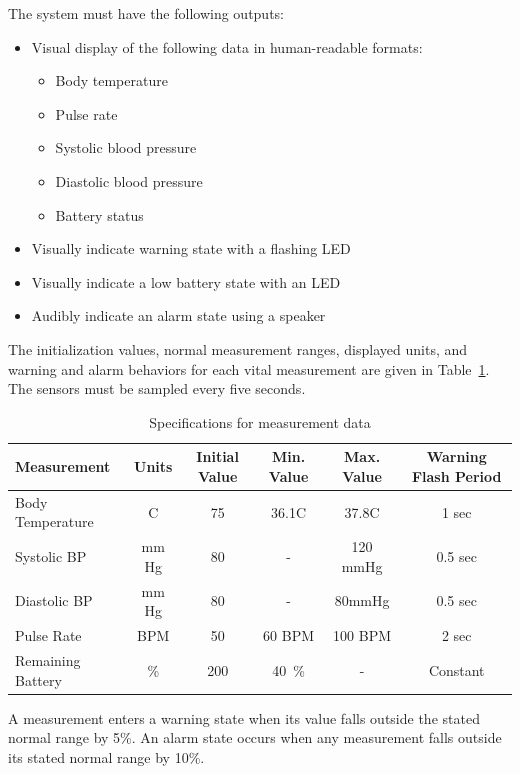 \documentclass[12pt]{article} %
\begin{document}
\begin{itemize}[$$]
 \item The system must have the following outputs:
    \begin{itemize}[$\bullet$]
      \item Visual display of the following data in human-readable formats:
	\begin{itemize}
	\item Body temperature
	\item Pulse rate
	\item Systolic blood pressure
	\item Diastolic blood pressure
	\item Battery status
	\end{itemize}
      \item Visually indicate warning state with a flashing LED
      \item Visually indicate a low battery state with an LED
      \item Audibly indicate an alarm state using a speaker
    \end{itemize}
\end{itemize}

The initialization values, normal measurement ranges, displayed units, and 
warning and alarm behaviors for each vital measurement are given in 
Table~\ref{tab:sensorDefs}. The sensors must be sampled every five seconds.

\begin{table}[h]
  \centering
  \begin{tabular}{|l|*{5}{c}|}
    \hline
    Measurement & Units & Initial Value & Min. Value & Max. Value & Warning Flash Period \\ \hline
    Body Temperature & C & 75 & 36.1C & 37.8C & 1 sec \\ \hline
    Systolic BP  & mm Hg & 80 & - & 120 mmHg & 0.5 sec \\ \hline
    Diastolic BP & mm Hg & 80 & - & 80mmHg & 0.5 sec \\ \hline
    Pulse Rate & BPM & 50 & 60 BPM & 100 BPM & 2 sec \\ \hline
    Remaining Battery & \% & 200 & 40~\% & - & Constant \\ \hline
  \end{tabular}
  \caption{Specifications for measurement data}
  \label{tab:sensorDefs}
\end{table}

A measurement enters a warning state when its value falls outside the stated 
normal range by 5\%. An alarm state occurs when any measurement falls outside
 its stated normal range by 10\%.
\end{document}
